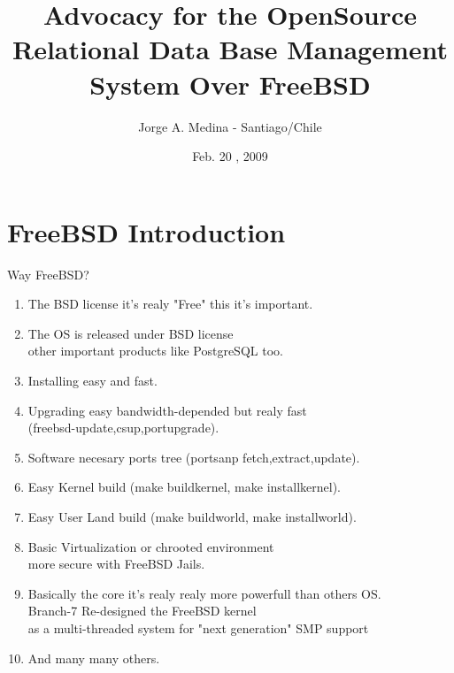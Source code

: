 \documentclass[xcolor=dvipsnames]{beamer}
\title[RDBMS Over FreeBSD]{Advocacy for the OpenSource Relational Data Base Management System Over FreeBSD}
\author{Jorge A. Medina - Santiago/Chile}
\institute{Computer Science Research Crew\\ http://www.bsdchile.cl \scriptsize{\textcircled{\tiny{R}}}}
\date{Feb. 20 , 2009}
\begin{document}
\fontsize{7}{9}
	\begin{frame}
		\titlepage
	\end{frame}

\section{FreeBSD Introduction}
	\begin{frame}{Way FreeBSD?}
		\begin{enumerate}
			\item The BSD license it's realy "Free" this it's important.
			\item The OS is released under BSD license \\other important products like PostgreSQL too.
			\item Installing easy and fast.
			\item Upgrading easy bandwidth-depended but realy fast\\(freebsd-update,csup,portupgrade).
			\item Software necesary ports tree (portsanp fetch,extract,update).
			\item Easy Kernel build (make buildkernel, make installkernel).
			\item Easy User Land build (make buildworld, make installworld).
			\item Basic Virtualization or chrooted environment \\more secure with FreeBSD Jails.
			\item Basically the core it's realy realy more powerfull than others OS.
					\\ Branch-7 Re-designed the FreeBSD kernel 
					\\ as a multi-threaded system for "next generation" SMP support
			\item And many many others.
		\end{enumerate}
	\end{frame}
	
\end{document}
